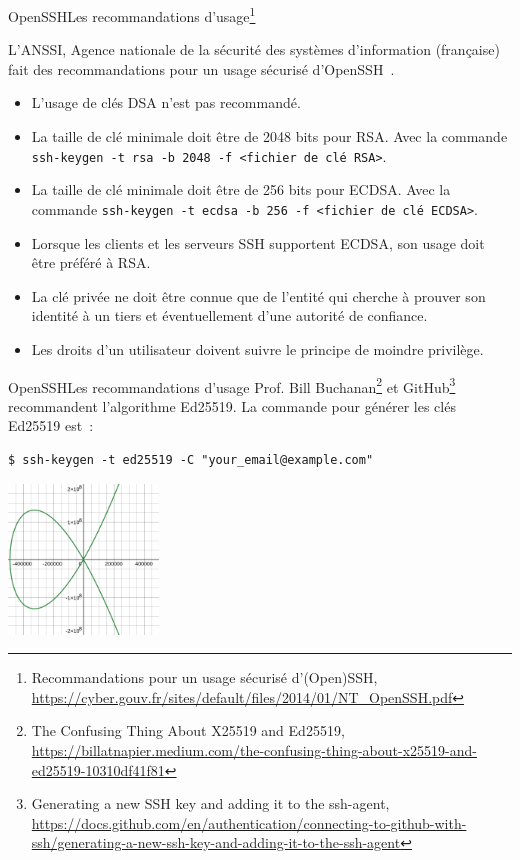 \documentclass{beamer}
\begin{document}
    \begin{frame}{OpenSSH}{Les recommandations d'usage\footnote{\label{openssh-anssi}Recommandations pour un usage sécurisé d’(Open)SSH, \url{https://cyber.gouv.fr/sites/default/files/2014/01/NT_OpenSSH.pdf}}}
        \begin{small}
            L'ANSSI, Agence nationale de la sécurité des systèmes d’information (française) fait des recommandations pour un usage sécurisé d'OpenSSH~.
            \bigbreak
            \begin{itemize}
                \item L’usage de clés DSA n’est pas recommandé.
                \item La taille de clé minimale doit être de 2048 bits pour RSA.
                Avec la commande \lstinline{ssh-keygen -t rsa -b 2048 -f <fichier de clé RSA>}.
                \item La taille de clé minimale doit être de 256 bits pour ECDSA.
                Avec la commande \lstinline{ssh-keygen -t ecdsa -b 256 -f <fichier de clé ECDSA>}.
                \item Lorsque les clients et les serveurs SSH supportent ECDSA, son usage doit être préféré à RSA.
                \item La clé privée ne doit être connue que de l’entité qui cherche à prouver son identité à un tiers et éventuellement d’une autorité de confiance.
                \item Les droits d’un utilisateur doivent suivre le principe de moindre privilège.
            \end{itemize}
        \end{small}
    \end{frame}

    \begin{frame}[fragile]{OpenSSH}{Les recommandations d'usage}
        Prof. Bill Buchanan\footnote{The Confusing Thing About X25519 and Ed25519, \url{https://billatnapier.medium.com/the-confusing-thing-about-x25519-and-ed25519-10310df41f81}} et GitHub\footnote{Generating a new SSH key and adding it to the ssh-agent, \url{https://docs.github.com/en/authentication/connecting-to-github-with-ssh/generating-a-new-ssh-key-and-adding-it-to-the-ssh-agent}} recommandent l'algorithme Ed25519.
        \bigbreak
        La commande pour générer les clés Ed25519 est~:
        \begin{lstlisting}
$ ssh-keygen -t ed25519 -C "your_email@example.com"
        \end{lstlisting}
        \begin{center}
            \includegraphics[width=4cm]{image/Ed25519-curve}
        \end{center}
    \end{frame}
\end{document}
